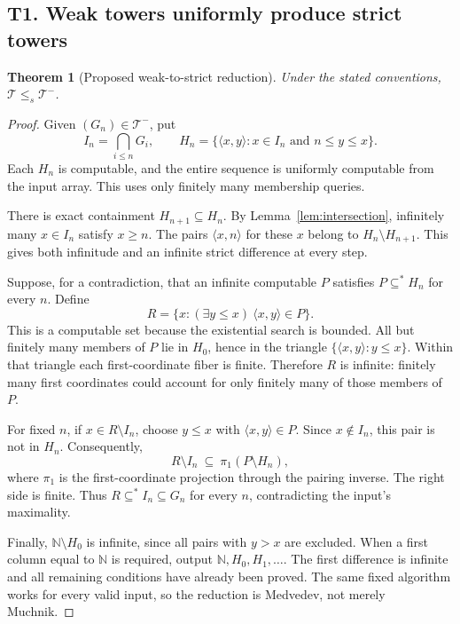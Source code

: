 \documentclass[11pt,a4paper]{article}
\newcommand{\N}{\mathbb N}
\newcommand{\T}{\mathcal T}\newcommand{\TF}{\mathcal{TF}}\newcommand{\Tw}{\mathcal T^{-}}
\newcommand{\substar}{\subseteq^{*}}\newcommand{\lestar}{\leq^{*}}
\newcommand{\pair}[2]{\langle#1,#2\rangle}
\newtheorem{theorem}{Theorem}[section]
\theoremstyle{definition}\newtheorem{definition}[theorem]{Definition}
\theoremstyle{remark}\newtheorem{remark}[theorem]{Remark}
\begin{document}
\subsection{T1. Weak towers uniformly produce strict towers}\label{entry:T1}
\begin{theorem}[Proposed weak-to-strict reduction]\label{thm:weak}
Under the stated conventions, $\T\leq_s\Tw$.
\end{theorem}
\begin{proof}
Given $(G_n)\in\Tw$, put
\begin{equation}
 I_n=\bigcap_{i\leq n}G_i,
 \qquad
 H_n=\{\pair{x}{y}:x\in I_n\text{ and }n\leq y\leq x\}.
 \label{eq:weakpad}
\end{equation}
Each $H_n$ is computable, and the entire sequence is uniformly computable
from the input array. This uses only finitely many membership queries.

There is exact containment $H_{n+1}\subseteq H_n$. By
Lemma~\ref{lem:intersection}, infinitely many $x\in I_n$ satisfy $x\geq n$.
The pairs $\pair{x}{n}$ for these $x$ belong to
$H_n\setminus H_{n+1}$. This gives both infinitude and an infinite strict
difference at every step.

Suppose, for a contradiction, that an infinite computable $P$ satisfies
$P\substar H_n$ for every $n$. Define
\begin{equation}
 R=\{x:(\exists y\leq x)\ \pair{x}{y}\in P\}.
 \label{eq:boundedprojection}
\end{equation}
This is a computable set because the existential search is bounded.
All but finitely many members of $P$ lie in $H_0$, hence in the triangle
$\{\pair{x}{y}:y\leq x\}$. Within that triangle each first-coordinate fiber
is finite. Therefore $R$ is infinite: finitely many first coordinates could
account for only finitely many of those members of $P$.

For fixed $n$, if $x\in R\setminus I_n$, choose $y\leq x$ with
$\pair{x}{y}\in P$. Since $x\notin I_n$, this pair is not in $H_n$.
Consequently,
\begin{equation}
 R\setminus I_n\ \subseteq\ \pi_1(P\setminus H_n),
 \label{eq:weakerror}
\end{equation}
where $\pi_1$ is the first-coordinate projection through the pairing inverse.
The right side is finite. Thus $R\substar I_n\subseteq G_n$ for every $n$,
contradicting the input's maximality.

Finally, $\N\setminus H_0$ is infinite, since all pairs with $y>x$ are
excluded. When a first column equal to $\N$ is required, output
$\N,H_0,H_1,\ldots$. The first difference is infinite and all remaining
conditions have already been proved. The same fixed algorithm works for every
valid input, so the reduction is Medvedev, not merely Muchnik.
\end{proof}
\end{document}
